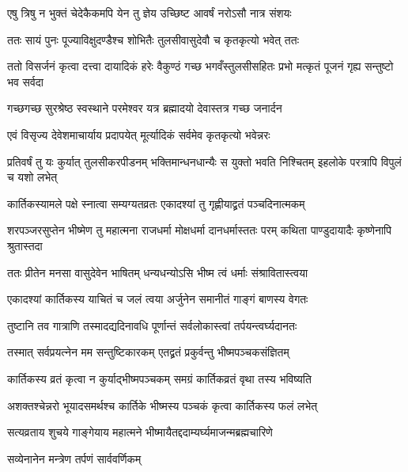 \twolineshloka
{एषु त्रिषु न भुक्तं चेदेकैकमपि येन तु}
{ज्ञेय उच्छिष्ट आवर्षं नरोऽसौ नात्र संशयः} %

\twolineshloka
{ततः सायं पुनः पूज्याविक्षुदण्डैश्च शोभितैः}
{तुलसीवासुदेवौ च कृतकृत्यो भवेत् ततः} %

\threelineshloka
{ततो विसर्जनं कृत्वा दत्त्वा दायादिकं हरेः}
{वैकुण्ठं गच्छ भगवँस्तुलसीसहितः प्रभो}
{मत्कृतं पूजनं गृह्य सन्तुष्टो भव सर्वदा} %

\twolineshloka
{गच्छगच्छ सुरश्रेष्ठ स्वस्थाने परमेश्वर}
{यत्र ब्रह्मादयो देवास्तत्र गच्छ जनार्दन} %

\twolineshloka
{एवं विसृज्य देवेशमाचार्याय प्रदापयेत्}
{मूर्त्यादिकं सर्वमेव कृतकृत्यो भवेन्नरः} %

\threelineshloka
{प्रतिवर्षं तु यः कुर्यात् तुलसीकरपीडनम्}
{भक्तिमान्धनधान्यैः स युक्तो भवति निश्चितम्}
{इहलोके परत्रापि विपुलं च यशो लभेत्} %





\twolineshloka
{कार्तिकस्यामले पक्षे स्नात्वा सम्यग्यतव्रतः}
{एकादश्यां तु गृह्णीयाद्व्रतं पञ्चदिनात्मकम्} %

\threelineshloka
{शरपञ्जरसुप्तेन भीष्मेण तु महात्मना}
{राजधर्मा मोक्षधर्मा दानधर्मास्ततः परम्}
{कथिता पाण्डुदायादैः कृष्णेनापि श्रुतास्तदा} %

\twolineshloka
{ततः प्रीतेन मनसा वासुदेवेन भाषितम्}
{धन्यधन्योऽसि भीष्म त्वं धर्माः संश्रावितास्त्वया} %

\twolineshloka
{एकादश्यां कार्तिकस्य याचितं च जलं त्वया}
{अर्जुनेन समानीतं गाङ्गं बाणस्य वेगतः} %

\twolineshloka
{तुष्टानि तव गात्राणि तस्मादद्यदिनावधि}
{पूर्णान्तं सर्वलोकास्त्वां तर्पयन्त्वर्घ्यदानतः} %

\twolineshloka
{तस्मात् सर्वप्रयत्नेन मम सन्तुष्टिकारकम्}
{एतद्व्रतं प्रकुर्वन्तु भीष्मपञ्चकसंज्ञितम्} %

\twolineshloka
{कार्तिकस्य व्रतं कृत्वा न कुर्याद्भीष्मपञ्चकम्}
{समग्रं कार्तिकव्रतं वृथा तस्य भविष्यति} %

\twolineshloka
{अशक्तश्चेन्नरो भूयादसमर्थश्च कार्तिके}
{भीष्मस्य पञ्चकं कृत्वा कार्तिकस्य फलं लभेत्} %

\twolineshloka
{सत्यव्रताय शुचये गाङ्गेयाय महात्मने}
{भीष्मायैतद्ददाम्यर्घ्यमाजन्मब्रह्मचारिणे} %


\onelineshloka
{सव्येनानेन मन्त्रेण तर्पणं सार्ववर्णिकम्} %

